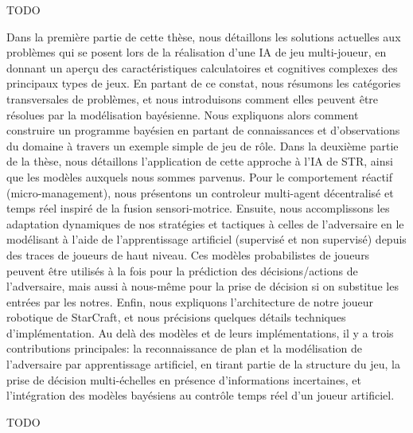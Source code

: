 TODO 

Dans la première partie de cette thèse, nous détaillons les solutions actuelles aux problèmes qui se posent lors de la réalisation d'une IA de jeu multi-joueur, en donnant un aperçu des caractéristiques calculatoires et cognitives complexes des principaux types de jeux. En partant de ce constat, nous résumons les catégories transversales de problèmes, et nous introduisons comment elles peuvent être résolues par la modélisation bayésienne. Nous expliquons alors comment construire un programme bayésien en partant de connaissances et d'observations du domaine à travers un exemple simple de jeu de rôle. Dans la deuxième partie de la thèse, nous détaillons l'application de cette approche à l'IA de STR, ainsi que les modèles auxquels nous sommes parvenus. Pour le comportement réactif (micro-management), nous présentons un controleur multi-agent décentralisé et temps réel inspiré de la fusion sensori-motrice. Ensuite, nous accomplissons les adaptation dynamiques de nos stratégies et tactiques à celles de l'adversaire en le modélisant à l'aide de l'apprentissage artificiel (supervisé et non supervisé) depuis des traces de joueurs de haut niveau. Ces modèles probabilistes de joueurs peuvent être utilisés à la fois pour la prédiction des décisions/actions de l'adversaire, mais aussi à nous-même pour la prise de décision si on substitue les entrées par les notres. Enfin, nous expliquons l'architecture de notre joueur robotique de StarCraft, et nous précisions quelques détails techniques d'implémentation.
Au delà des modèles et de leurs implémentations, il y a trois contributions principales: la reconnaissance de plan et la modélisation de l'adversaire par apprentissage artificiel, en tirant partie de la structure du jeu, la prise de décision multi-échelles en présence d'informations incertaines, et l'intégration des modèles bayésiens au contrôle temps réel d'un joueur artificiel.

TODO

